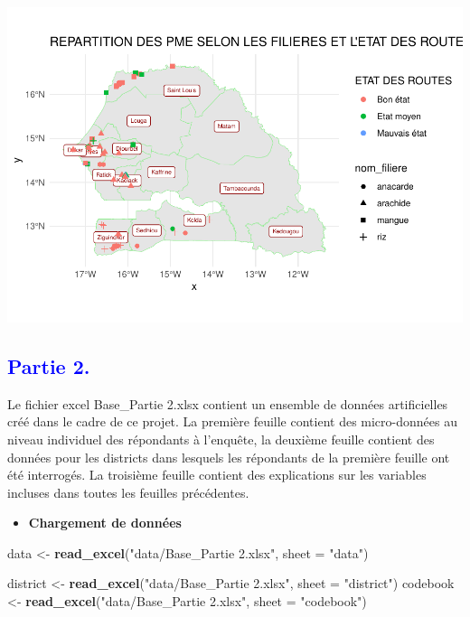 \documentclass[
]{article}
\newenvironment{Shaded}{\begin{snugshade}}{\end{snugshade}}
\newcommand{\AttributeTok}[1]{\textcolor[rgb]{0.13,0.29,0.53}{#1}}
\newcommand{\FunctionTok}[1]{\textcolor[rgb]{0.13,0.29,0.53}{\textbf{#1}}}
\newcommand{\NormalTok}[1]{#1}
\newcommand{\OtherTok}[1]{\textcolor[rgb]{0.56,0.35,0.01}{#1}}
\newcommand{\StringTok}[1]{\textcolor[rgb]{0.31,0.60,0.02}{#1}}
\providecommand{\tightlist}{%
  \setlength{\itemsep}{0pt}\setlength{\parskip}{0pt}}
\begin{document}
\begin{center}\includegraphics{Projet_R_ISE_1_files/figure-latex/unnamed-chunk-42-1} \end{center}

\hfill\break

\textcolor{blue}{\section{Partie 2.}}

\hfill\break
Le fichier excel Base\_Partie 2.xlsx contient un ensemble de données
artificielles créé dans le cadre de ce projet. La première feuille
contient des micro-données au niveau individuel des répondants à
l'enquête, la deuxième feuille contient des données pour les districts
dans lesquels les répondants de la première feuille ont été interrogés.
La troisième feuille contient des explications sur les variables
incluses dans toutes les feuilles précédentes.\\

\hfill\break

\begin{itemize}
\tightlist
\item
  \textbf{Chargement de données}\\
\end{itemize}

\begin{Shaded}
\begin{Highlighting}[]
\NormalTok{data }\OtherTok{\textless{}{-}} \FunctionTok{read\_excel}\NormalTok{(}\StringTok{"data/Base\_Partie 2.xlsx"}\NormalTok{, }
     \AttributeTok{sheet =} \StringTok{"data"}\NormalTok{)}


\NormalTok{district }\OtherTok{\textless{}{-}} \FunctionTok{read\_excel}\NormalTok{(}\StringTok{"data/Base\_Partie 2.xlsx"}\NormalTok{, }
     \AttributeTok{sheet =} \StringTok{"district"}\NormalTok{)}
\NormalTok{codebook }\OtherTok{\textless{}{-}} \FunctionTok{read\_excel}\NormalTok{(}\StringTok{"data/Base\_Partie 2.xlsx"}\NormalTok{, }
     \AttributeTok{sheet =} \StringTok{"codebook"}\NormalTok{)}
\end{Highlighting}
\end{Shaded}
\end{document}
